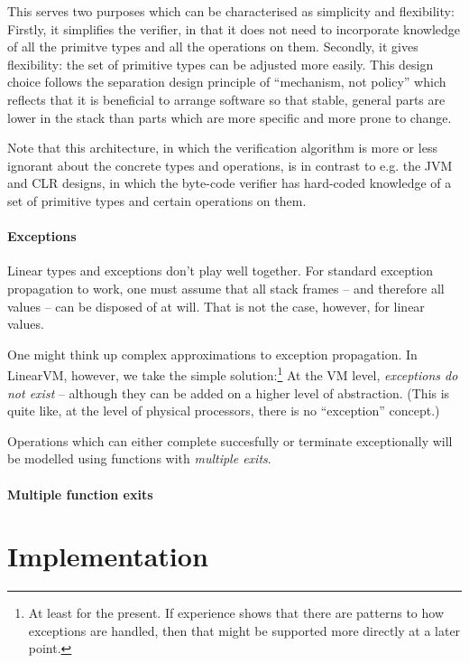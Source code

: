 \documentclass[a4paper]{book}
\begin{document}
This serves two purposes which can be characterised as simplicity and flexibility:
Firstly, it simplifies the verifier, in that it does not need to incorporate
knowledge of all the primitve types and all the operations on them.
Secondly, it gives flexibility: the set of primitive types can be adjusted
more easily.
This design choice follows the separation design principle of ``mechanism,
not policy'' which reflects that it is beneficial to arrange software so
that stable, general parts are lower in the stack than parts which are
more specific and more prone to change.

Note that this architecture, in which the verification algorithm is
more or less ignorant about the concrete types and operations,
is in contrast to e.g. the JVM and CLR designs, in which the
byte-code verifier has hard-coded knowledge of a set of primitive types
and certain operations on them.

\subsection{Exceptions}

Linear types and exceptions don't play well together.
For standard exception propagation to work, one must assume that
all stack frames -- and therefore all values -- can be disposed of at will.
That is not the case, however, for linear values.

One might think up complex approximations to exception propagation.
In LinearVM, however, we take the simple solution:\footnote{
At least for the present. If experience shows that there are patterns to how exceptions are handled, then that might be supported more directly at a later point.}
At the VM level, \emph{exceptions do not exist} -- although they can be added on
a higher level of abstraction.
(This is quite like, at the level of physical processors, there is no
``exception'' concept.)

Operations which can either complete succesfully or terminate exceptionally
will be modelled using functions with \emph{multiple exits}.

\subsection{Multiple function exits}


\part{Implementation}
\end{document}
